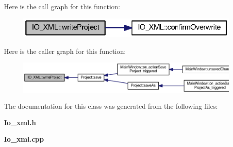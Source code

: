 Here is the call graph for this function\-:\nopagebreak
\begin{figure}[H]
\begin{center}
\leavevmode
\includegraphics[width=318pt]{class_i_o___x_m_l_a4f26762e4ee76461a097ce109127be21_cgraph}
\end{center}
\end{figure}




Here is the caller graph for this function\-:\nopagebreak
\begin{figure}[H]
\begin{center}
\leavevmode
\includegraphics[width=350pt]{class_i_o___x_m_l_a4f26762e4ee76461a097ce109127be21_icgraph}
\end{center}
\end{figure}




The documentation for this class was generated from the following files\-:\begin{DoxyCompactItemize}
\item 
{\bf Io\-\_\-xml.\-h}\item 
{\bf Io\-\_\-xml.\-cpp}\end{DoxyCompactItemize}
